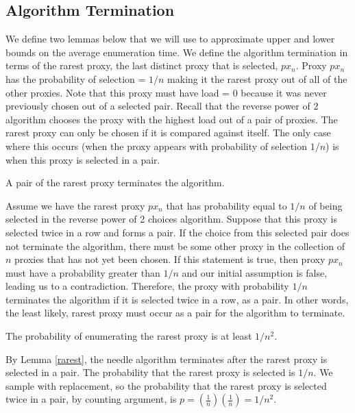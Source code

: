 \subsection{Algorithm Termination}

We define two lemmas below that we will use to approximate upper and lower bounds on the average enumeration time. We define the algorithm termination in terms of the rarest proxy, the last distinct proxy that is selected, $px_n$. Proxy $px_n$ has the probability of selection = $1/n$ making it the rarest proxy out of all of the other proxies. Note that this proxy must have load = 0 because it was never previously chosen out of a selected pair. Recall that the reverse power of 2 algorithm chooses the proxy with the highest load out of a pair of proxies. The rarest proxy can only be chosen if it is compared against itself. The only case where this occurs (when the proxy appears with probability of selection $1/n$) is when this proxy is selected in a pair. 

\begin{lemma}{A pair of the rarest proxy terminates the algorithm.}
\label{rarest}

Assume we have the rarest proxy \textbf{$px_n$} that has probability equal to $1/n$ of being selected in the reverse power of 2 choices algorithm. Suppose that this proxy is selected twice in a row and forms a pair. If the choice from this selected pair does not terminate the algorithm, there must be some other proxy in the collection of $n$ proxies that has not yet been chosen. If this statement is true, then proxy \textbf{$px_n$} must have a probability greater than $1/n$ and our initial assumption is false, leading us to a contradiction. Therefore, the proxy with probability $1/n$ terminates the algorithm if it is selected twice in a row, as a pair. In other words, the least likely, rarest proxy must occur as a pair for the algorithm to terminate. 
\end{lemma}

\begin{lemma}{The probability of enumerating the rarest proxy is at least $1/n^2$.}

By Lemma \ref{rarest}, the needle algorithm terminates after the rarest proxy is selected in a pair. The probability that the rarest proxy is selected is $1/n$. We sample with replacement, so the probability that the rarest proxy is selected twice in a pair, by counting argument, is $p=(\frac{1}{n})(\frac{1}{n}) = 1/n^2$.
\end{lemma}

